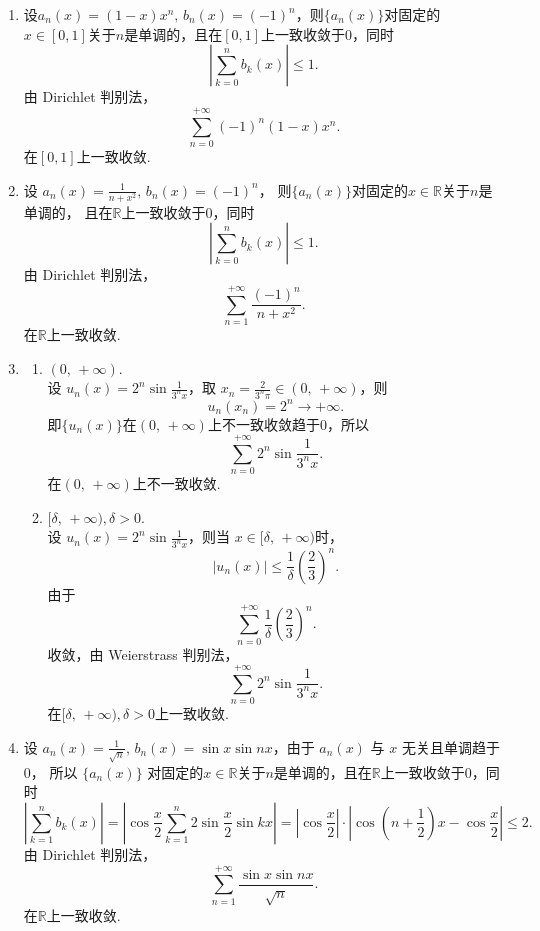 \begin{enumerate}
\begin{solution}
\begin{enumerate}
        \item 设$a_n(x)=(1-x)x^n,\,b_n(x)=(-1)^n$，则$\{a_n(x)\}$对固定的$x\in[0,1]$关于$n$是单调的，且在$[0,1]$上一致收敛于0，同时
        \[
        \left|\sum_{k=0}^{n}b_k(x)\right|\leq 1.
        \]
        由 Dirichlet 判别法，
        \[
        \sum_{n=0}^{+\infty}(-1)^n(1-x)x^n.
        \]
        在$[0,1]$上一致收敛.

        \item 设 $\displaystyle a_n(x)=\frac{1}{n+x^2},\,b_n(x)=(-1)^n$，
        则$\{a_n(x)\}$对固定的$x\in\mathbb{R}$关于$n$是单调的，
        且在$\mathbb{R}$上一致收敛于0，同时
        \[
        \left|\sum_{k=0}^{n}b_k(x)\right|\leq 1.
        \]
        由 Dirichlet 判别法，
        \[
        \sum_{n=1}^{+\infty}\frac{(-1)^n}{n+x^2}.
        \]
        在$\mathbb{R}$上一致收敛.

        \item 
        \begin{enumerate}
        \item[i.] $(0,\,+\infty).$\\ 
        设 $\displaystyle u_n(x)=2^n\sin\frac{1}{3^nx}$，取 $\displaystyle x_n=\frac{2}{3^n\pi}\in(0,\,+\infty)$，则
        \[
        u_n(x_n)=2^n\to+\infty.
        \] 
        即$\{u_n(x)\}$在$(0,\,+\infty)$上不一致收敛趋于0，所以
        \[
        \sum_{n=0}^{+\infty}2^n\sin\frac{1}{3^nx}.
        \]
        在$(0,\,+\infty)$上不一致收敛.
        \item[ii.] $[\delta,\,+\infty),\delta>0.$\\
        设 $\displaystyle u_n(x)=2^n\sin\frac{1}{3^nx}$，则当 $x\in [\delta,\,+\infty)$时，
        \[
        \left|u_n(x)\right|\leq \frac{1}{\delta}\left(\frac{2}{3}\right)^n.
        \]
        由于
        \[
        \sum_{n=0}^{+\infty}\frac{1}{\delta}\left(\frac{2}{3}\right)^n.
        \]
        收敛，由 Weierstrass 判别法，
        \[
        \sum_{n=0}^{+\infty}2^n\sin\frac{1}{3^nx}.
        \]
        在$[\delta,\,+\infty),\delta>0$上一致收敛.
        \end{enumerate}

        \item 
        设 $\displaystyle a_n(x)=\frac{1}{\sqrt{n}},\,b_n(x)=\sin{x}\sin{nx}$，由于 $a_n(x)$ 与 $x$ 无关且单调趋于0，
        所以 $\{a_n(x)\}$ 对固定的$x\in\mathbb{R}$关于$n$是单调的，且在$\mathbb{R}$上一致收敛于0，同时
        \[
        \left|\sum_{k=1}^{n}b_k(x)\right|=\left|\cos{\frac{x}{2}}\sum_{k=1}^{n}2\sin{\frac{x}{2}}\sin{kx}\right|=\left|\cos{\frac{x}{2}}\right|\cdot\left|\cos\left(n+\frac{1}{2}\right)x-\cos\frac{x}{2}\right|\leq 2.
        \]
        由 Dirichlet 判别法，
        \[
        \sum_{n=1}^{+\infty}\frac{\sin{x}\sin{nx}}{\sqrt{n}}.
        \]
        在$\mathbb{R}$上一致收敛.


\end{enumerate}
\end{solution}
\end{enumerate}
